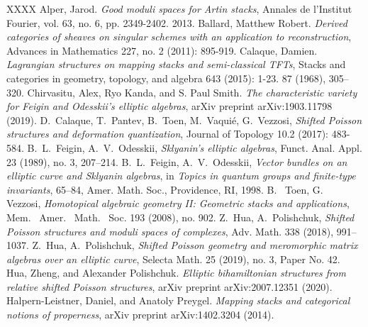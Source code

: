 \documentclass[reqno]{amsart}
\theoremstyle{definition}
\theoremstyle{remark}
\numberwithin{equation}{section}
\begin{document}
\begin{thebibliography}{XXXX}
Alper, Jarod. {\it Good moduli spaces for Artin stacks}, Annales de l'Institut Fourier, vol. 63, no. 6, pp. 2349-2402. 2013.
Ballard, Matthew Robert. {\it Derived categories of sheaves on singular schemes with an application to reconstruction}, Advances in Mathematics 227, no. 2 (2011): 895-919.
 Calaque, Damien. {\it Lagrangian structures on mapping stacks and semi-classical TFTs}, Stacks and categories in geometry, topology, and algebra 643 (2015): 1-23.
87 (1968), 305--320.
 Chirvasitu, Alex, Ryo Kanda, and S. Paul Smith. \emph{The characteristic variety for Feigin and Odesskii's elliptic algebras}, arXiv preprint arXiv:1903.11798 (2019).
 D.~Calaque, T.~Pantev, B.~Toen, M.~Vaqui\'e, G.~Vezzosi, \emph{Shifted Poisson structures and deformation quantization}, Journal of Topology 10.2 (2017): 483-584.
 B.~L.~Feigin, A.~V.~Odesskii, {\it Sklyanin's elliptic algebras}, 
Funct. Anal. Appl. 23 (1989), no. 3, 207--214.
 B.~L.~Feigin, A.~V.~Odesskii, {\it Vector bundles on an elliptic curve and Sklyanin algebras}, in 
{\it Topics in quantum groups and finite-type invariants}, 65--84, Amer. Math. Soc., Providence, RI, 1998.
 B. ~Toen, G.~ Vezzosi, \emph{Homotopical algebraic geometry II: Geometric stacks and
applications}, Mem.~ Amer.~ Math.~ Soc. 193 (2008), no. 902.
 Z.~Hua, A.~Polishchuk, {\it Shifted Poisson structures and moduli spaces of complexes}, Adv. Math. 338 (2018), 991--1037.
 Z.~Hua, A.~Polishchuk, {\it Shifted Poisson geometry and meromorphic matrix algebras over an elliptic curve}, 
Selecta Math. 25 (2019), no. 3, Paper No. 42.
 Hua, Zheng, and Alexander Polishchuk. {\it Elliptic bihamiltonian structures from relative shifted Poisson structures}, arXiv preprint arXiv:2007.12351 (2020).
Halpern-Leistner, Daniel, and Anatoly Preygel. {\it Mapping stacks and categorical notions of properness}, arXiv preprint arXiv:1402.3204 (2014).

\end{thebibliography}
\end{document}
